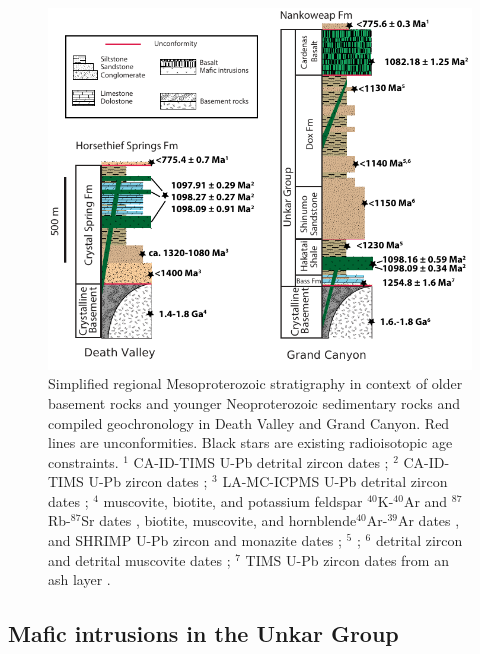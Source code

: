 \begin{figure}[h!]
\centering
\includegraphics[width=\textwidth]{figure/Zhang2024b/DV_GC_Mesoproterozoic_strat_columns.pdf}
\caption[Simplified regional stratigraphy in Death Valley and Grand Canyon]{\footnotesize Simplified regional Mesoproterozoic stratigraphy in context of older basement rocks and younger Neoproterozoic sedimentary rocks and compiled geochronology in Death Valley and Grand Canyon. Red lines are unconformities. Black stars are existing radioisotopic age constraints. $^1$ CA-ID-TIMS U-Pb detrital zircon dates \citep{Dehler2023a}; $^2$ CA-ID-TIMS U-Pb zircon dates \citep{Mohr2024a}; $^3$ LA-MC-ICPMS U-Pb detrital zircon dates \citep{Mahon2014b}; $^4$ muscovite, biotite, and potassium feldspar $^{40}$K-$^{40}$Ar and $^{87}$Rb-$^{87}$Sr dates \citep{Lanphere1964b}, biotite, muscovite, and hornblende$^{40}$Ar-$^{39}$Ar dates \cite{Labotka1985a}, and SHRIMP U-Pb zircon and monazite dates \cite{Barth2001a, Barth2009a}; $^5$ \cite{Mulder2017a}; $^6$ detrital zircon and detrital muscovite dates \cite{Timmons2005a}; $^7$ TIMS U-Pb zircon dates from an ash layer \cite{Timmons2005a}.}
\label{fig:DV_GC_strat_columns}
\end{figure}

\subsection*{Mafic intrusions in the Unkar Group}

